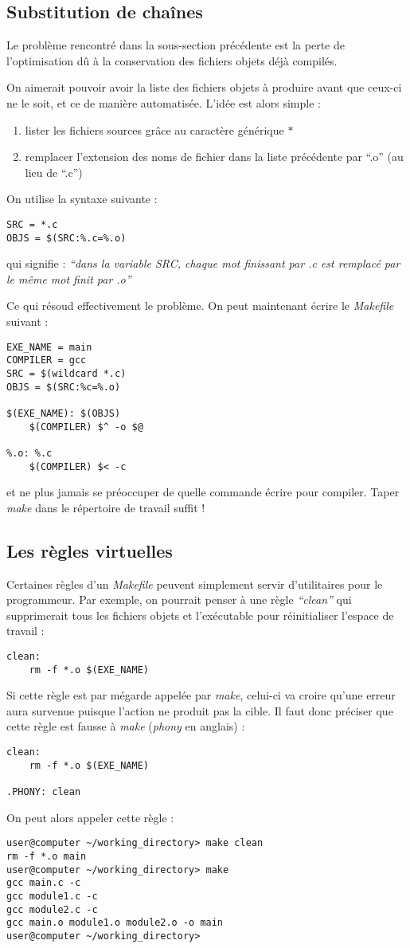 \documentclass[../../../main.tex]{subfiles}
\begin{document}
\subsection{Substitution de chaînes}
Le problème rencontré dans la sous-section précédente est la perte de l'optimisation dû à la conservation des fichiers objets déjà compilés.
 
On aimerait pouvoir avoir la liste des fichiers objets à produire avant que ceux-ci ne le soit, et ce de manière automatisée. L'idée est alors simple :
\begin{enumerate}
	\item lister les fichiers sources grâce au caractère générique $*$
	\item remplacer l'extension des noms de fichier dans la liste précédente par ``.o'' (au lieu de ``.c'')
\end{enumerate}
On utilise la syntaxe suivante :
\begin{verbatim}
SRC = *.c
OBJS = $(SRC:%.c=%.o)
\end{verbatim}
qui signifie : \textit{``dans la variable SRC, chaque mot finissant par .c est remplacé par le même mot finit par .o''}
 
Ce qui résoud effectivement le problème. On peut maintenant écrire le \textit{Makefile} suivant :
\begin{verbatim}
EXE_NAME = main
COMPILER = gcc
SRC = $(wildcard *.c)
OBJS = $(SRC:%c=%.o)

$(EXE_NAME): $(OBJS)
	$(COMPILER) $^ -o $@

%.o: %.c
	$(COMPILER) $< -c
\end{verbatim}
et ne plus jamais se préoccuper de quelle commande écrire pour compiler. Taper \textit{make} dans le répertoire de travail suffit !
\subsection{Les règles virtuelles}
Certaines règles d'un \textit{Makefile} peuvent simplement servir d'utilitaires pour le programmeur. Par exemple, on pourrait penser à une règle \textit{``clean''} qui supprimerait tous les fichiers objets et l'exécutable pour réinitialiser l'espace de travail :
\begin{verbatim}
clean:
	rm -f *.o $(EXE_NAME)
\end{verbatim}
Si cette règle est par mégarde appelée par \textit{make}, celui-ci va croire qu'une erreur aura survenue puisque l'action ne produit pas la cible. Il faut donc préciser que cette règle est fausse à \textit{make} (\textit{phony} en anglais) :
\begin{verbatim}
clean:
	rm -f *.o $(EXE_NAME)

.PHONY: clean
\end{verbatim}
On peut alors appeler cette règle :
\begin{verbatim}
user@computer ~/working_directory> make clean
rm -f *.o main
user@computer ~/working_directory> make
gcc main.c -c
gcc module1.c -c
gcc module2.c -c
gcc main.o module1.o module2.o -o main
user@computer ~/working_directory>
\end{verbatim}
\end{document}
